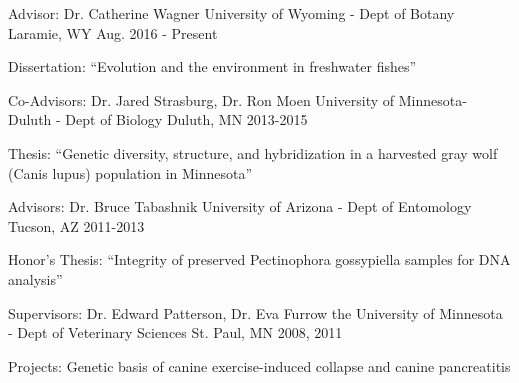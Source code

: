 

\begin{cventries}

  \cventry
    {Advisor: Dr. Catherine Wagner} %
    {University of Wyoming - Dept of Botany} %
    {Laramie, WY} %
    {Aug. 2016 - Present} %
    {
      \begin{cvitems} %
        \item {Dissertation: ``Evolution and the environment in freshwater fishes”}
      \end{cvitems}
    }

  \cventry
    {Co-Advisors: Dr. Jared Strasburg, Dr. Ron Moen} %
    {University of Minnesota- Duluth - Dept of Biology} %
    {Duluth, MN} %
    {2013-2015} %
    {
      \begin{cvitems} %
        \item {Thesis: ``Genetic diversity, structure, and hybridization in a harvested gray wolf (Canis lupus) population in Minnesota” }
      \end{cvitems}
    }

  \cventry
    {Advisors: Dr. Bruce Tabashnik} %
    {University of Arizona - Dept of Entomology} %
    {Tucson, AZ} %
    {2011-2013} %
    {
      \begin{cvitems} %
        \item {Honor's Thesis: ``Integrity of preserved Pectinophora gossypiella samples for DNA analysis” }
      \end{cvitems}
    }

  \cventry
    {Supervisors: Dr. Edward Patterson, Dr. Eva Furrow} %
    {the University of Minnesota - Dept of Veterinary Sciences} %
    {St. Paul, MN} %
    {2008, 2011} %
    {
      \begin{cvitems} %
        \item {Projects: Genetic basis of canine exercise-induced collapse and canine pancreatitis}
      \end{cvitems}
    }

\end{cventries}
